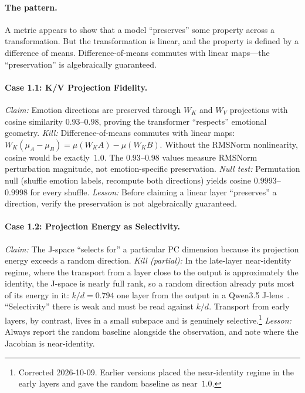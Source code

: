 \documentclass[11pt,a4paper]{article}
\begin{document}
\paragraph{The pattern.} A metric appears to show that a model
``preserves'' some property across a transformation. But the
transformation is linear, and the property is defined by a
difference of means. Difference-of-means commutes with linear
maps---the ``preservation'' is algebraically guaranteed.

\paragraph{Case 1.1: K/V Projection Fidelity.}
\emph{Claim:} Emotion directions are preserved through $W_K$ and $W_V$
projections with cosine similarity $0.93$--$0.98$, proving the
transformer ``respects'' emotional geometry.
\emph{Kill:} Difference-of-means commutes with linear maps:
$W_K (\mu_A - \mu_B) = \mu(W_K A) - \mu(W_K B)$. Without the RMSNorm
nonlinearity, cosine would be exactly~$1.0$. The $0.93$--$0.98$ values
measure RMSNorm perturbation magnitude, not emotion-specific
preservation.
\emph{Null test:} Permutation null (shuffle emotion labels, recompute
both directions) yields cosine $0.9993$--$0.9998$ for every shuffle.
\emph{Lesson:} Before claiming a linear layer ``preserves'' a direction,
verify the preservation is not algebraically guaranteed.

\paragraph{Case 1.2: Projection Energy as Selectivity.}
\emph{Claim:} The J-space ``selects for'' a particular PC dimension
because its projection energy exceeds a random direction.
\emph{Kill (partial):} In the late-layer near-identity regime, where the
transport from a layer close to the output is approximately the identity,
the J-space is nearly full rank, so a random direction already puts most
of its energy in it: $k/d = 0.794$ one layer from the output in a Qwen3.5
J-lens~\citep{jerrickhoang2026}. ``Selectivity'' there is weak and must be
read against $k/d$. Transport from early layers, by contrast, lives in a
small subspace and is genuinely selective.\footnote{Corrected 2026-10-09.
Earlier versions placed the near-identity regime in the early layers and
gave the random baseline as near~$1.0$.}
\emph{Lesson:} Always report the random baseline alongside the
observation, and note where the Jacobian is near-identity.
\end{document}

